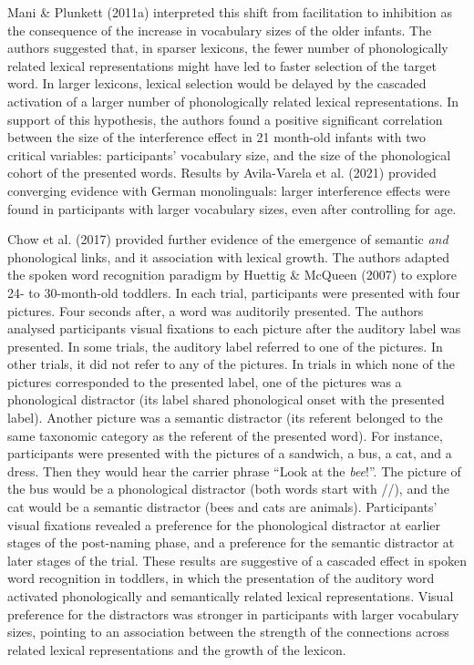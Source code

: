 \documentclass[
  12pt,
  b5paperpaper,
  twoside]{scrreprt}
\begin{document}
Mani \& Plunkett (2011a) interpreted this shift from facilitation to
inhibition as the consequence of the increase in vocabulary sizes of the
older infants. The authors suggested that, in sparser lexicons, the
fewer number of phonologically related lexical representations might
have led to faster selection of the target word. In larger lexicons,
lexical selection would be delayed by the cascaded activation of a
larger number of phonologically related lexical representations. In
support of this hypothesis, the authors found a positive significant
correlation between the size of the interference effect in 21 month-old
infants with two critical variables: participants' vocabulary size, and
the size of the phonological cohort of the presented words. Results by
Avila-Varela et al. (2021) provided converging evidence with German
monolinguals: larger interference effects were found in participants
with larger vocabulary sizes, even after controlling for age.

Chow et al. (2017) provided further evidence of the emergence of
semantic \emph{and} phonological links, and it association with lexical
growth. The authors adapted the spoken word recognition paradigm by
Huettig \& McQueen (2007) to explore 24- to 30-month-old toddlers. In
each trial, participants were presented with four pictures. Four seconds
after, a word was auditorily presented. The authors analysed
participants visual fixations to each picture after the auditory label
was presented. In some trials, the auditory label referred to one of the
pictures. In other trials, it did not refer to any of the pictures. In
trials in which none of the pictures corresponded to the presented
label, one of the pictures was a phonological distractor (its label
shared phonological onset with the presented label). Another picture was
a semantic distractor (its referent belonged to the same taxonomic
category as the referent of the presented word). For instance,
participants were presented with the pictures of a sandwich, a bus, a
cat, and a dress. Then they would hear the carrier phrase ``Look at the
\emph{bee}!''. The picture of the bus would be a phonological distractor
(both words start with //), and the cat would be a semantic
distractor (bees and cats are animals). Participants' visual fixations
revealed a preference for the phonological distractor at earlier stages
of the post-naming phase, and a preference for the semantic distractor
at later stages of the trial. These results are suggestive of a cascaded
effect in spoken word recognition in toddlers, in which the presentation
of the auditory word activated phonologically and semantically related
lexical representations. Visual preference for the distractors was
stronger in participants with larger vocabulary sizes, pointing to an
association between the strength of the connections across related
lexical representations and the growth of the lexicon.
\end{document}
